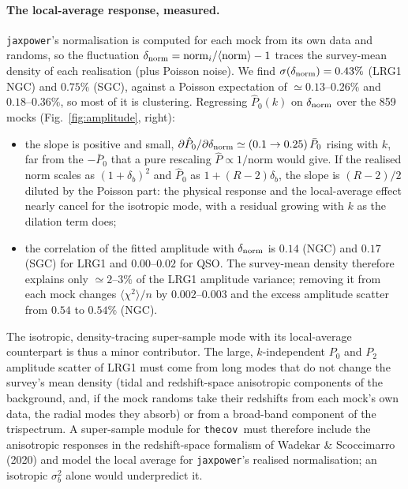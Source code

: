 \documentclass[11pt]{article}
\newcommand{\thecov}{\texttt{thecov}}
\begin{document}
\paragraph{The local-average response, measured.} \texttt{jaxpower}'s normalisation is computed for each mock from its own data and randoms, so the fluctuation $\delta_{\rm norm}=\mathrm{norm}_i/\langle\mathrm{norm}\rangle-1$ traces the survey-mean density of each realisation (plus Poisson noise). We find $\sigma(\delta_{\rm norm})=0.43\%$ (LRG1 NGC) and $0.75\%$ (SGC), against a Poisson expectation of $\simeq0.13$--$0.26\%$ and $0.18$--$0.36\%$, so most of it is clustering. Regressing $\hat P_0(k)$ on $\delta_{\rm norm}$ over the 859 mocks (Fig.~\ref{fig:amplitude}, right):
\begin{itemize}
\item the slope is positive and small, $\partial\hat P_0/\partial\delta_{\rm norm}\simeq(0.1\to0.25)\,\bar P_0$ rising with $k$, far from the $-\bar P_0$ that a pure rescaling $\hat P\propto1/\mathrm{norm}$ would give. If the realised norm scales as $(1+\delta_b)^2$ and $\hat P_0$ as $1+(R-2)\delta_b$, the slope is $(R-2)/2$ diluted by the Poisson part: the physical response and the local-average effect nearly cancel for the isotropic mode, with a residual growing with $k$ as the dilation term does;
\item the correlation of the fitted amplitude with $\delta_{\rm norm}$ is $0.14$ (NGC) and $0.17$ (SGC) for LRG1 and $0.00$--$0.02$ for QSO. The survey-mean density therefore explains only $\simeq2$--$3\%$ of the LRG1 amplitude variance; removing it from each mock changes $\langle\chi^2\rangle/n$ by $0.002$--$0.003$ and the excess amplitude scatter from $0.54$ to $0.54\%$ (NGC).
\end{itemize}
The isotropic, density-tracing super-sample mode with its local-average counterpart is thus a minor contributor. The large, $k$-independent $P_0$ and $P_2$ amplitude scatter of LRG1 must come from long modes that do not change the survey's mean density (tidal and redshift-space anisotropic components of the background, and, if the mock randoms take their redshifts from each mock's own data, the radial modes they absorb) or from a broad-band component of the trispectrum. A super-sample module for \thecov\ must therefore include the anisotropic responses in the redshift-space formalism of Wadekar \& Scoccimarro (2020) and model the local average for \texttt{jaxpower}'s realised normalisation; an isotropic $\sigma_b^2$ alone would underpredict it.
\end{document}
